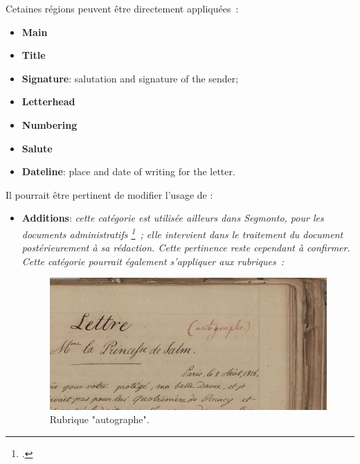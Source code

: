 \documentclass[a4paper,12pt,twoside]{book}
\newcommand{\langue}[1]{\emph{#1}}
\begin{document}
	        Cetaines régions peuvent être directement appliquées :
			\begin{itemize}
				\item \textbf{Main}
				\item \textbf{Title}
				\item \textbf{Signature}: salutation and signature of the sender;
				\item \textbf{Letterhead}
				\item \textbf{Numbering}
				\item \textbf{Salute}
				\item \textbf{Dateline}: place and date of writing for the letter.
			\end{itemize}
			
			Il pourrait être pertinent de modifier l'usage de :
			\begin{itemize}
				\item \textbf{Additions}: \langue{cette catégorie est utilisée ailleurs dans \gls{Segmonto}, pour les documents administratifs			\selectlanguage{french}\footcite{chagueDocumentsAdministratifsXIXe2021}~; elle intervient dans le traitement du document postérieurement à sa rédaction. Cette pertinence reste cependant à confirmer. Cette catégorie pourrait également s'appliquer aux rubriques~:}
				\begin{figure}[!h]
					\centering
					\includegraphics{img/CdS02_Konv002-02_0064_detail.jpg}
					\caption{Rubrique "autographe".}
					\label{autographe}%
				\end{figure}
			\end{itemize}
\end{document}
